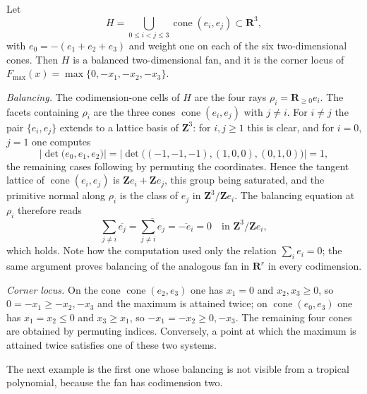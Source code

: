 \begin{example}
\label{ex:ch10-standard-plane}
Let
\[
 H=\bigcup_{0\leq i<j\leq3}\operatorname{cone}(e_i,e_j)
 \subset\mathbf R^3,
\]
with $e_0=-(e_1+e_2+e_3)$ and weight one on each of the six
two-dimensional cones.  Then $H$ is a balanced two-dimensional fan, and it is
the corner locus of $F_{\max}(x)=\max\{0,-x_1,-x_2,-x_3\}$.

\emph{Balancing.}  The codimension-one cells of $H$ are the four rays
$\rho_i=\mathbf R_{\geq0}e_i$.  The facets containing $\rho_i$ are the three
cones $\operatorname{cone}(e_i,e_j)$ with $j\neq i$.  For $i\neq j$ the pair
$\{e_i,e_j\}$ extends to a lattice basis of $\mathbf Z^3$: for
$i,j\geq1$ this is clear, and for $i=0$, $j=1$ one computes
\[
 \bigl|\det\bigl(e_0,e_1,e_2\bigr)\bigr|
 =\bigl|\det\bigl((-1,-1,-1),(1,0,0),(0,1,0)\bigr)\bigr|=1,
\]
the remaining cases following by permuting the coordinates.  Hence the
tangent lattice of $\operatorname{cone}(e_i,e_j)$ is
$\mathbf Ze_i+\mathbf Ze_j$, this group being saturated, and
the primitive normal along $\rho_i$ is the class of $e_j$ in
$\mathbf Z^3/\mathbf Ze_i$.  The balancing equation at $\rho_i$ therefore
reads
\[
 \sum_{j\neq i}\overline{e_j}
 =\overline{\textstyle\sum_{j\neq i}e_j}
 =\overline{-e_i}=0
 \quad\text{in }\mathbf Z^3/\mathbf Ze_i,
\]
which holds.  Note how the computation used only the relation
$\sum_ie_i=0$; the same argument proves balancing of the analogous fan in
$\mathbf R^r$ in every codimension.

\emph{Corner locus.}  On the cone $\operatorname{cone}(e_2,e_3)$ one has
$x_1=0$ and $x_2,x_3\geq0$, so $0=-x_1\geq-x_2,-x_3$ and the maximum is
attained twice; on $\operatorname{cone}(e_0,e_3)$ one has $x_1=x_2\leq0$ and
$x_3\geq x_1$, so $-x_1=-x_2\geq0,-x_3$.  The remaining four cones are
obtained by permuting indices.  Conversely, a point at which the maximum is
attained twice satisfies one of these two systems.
\end{example}

The next example is the first one whose balancing is not visible from a
tropical polynomial, because the fan has codimension two.

